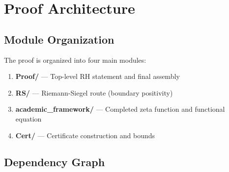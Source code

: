 \documentclass[12pt,a4paper]{article}
\begin{document}
\section{Proof Architecture}

\subsection{Module Organization}

The proof is organized into four main modules:

\begin{enumerate}
    \item \textbf{Proof/} --- Top-level RH statement and final assembly
    \item \textbf{RS/} --- Riemann-Siegel route (boundary positivity)
    \item \textbf{academic\_framework/} --- Completed zeta function and functional equation
    \item \textbf{Cert/} --- Certificate construction and bounds
\end{enumerate}

\subsection{Dependency Graph}
\end{document}
